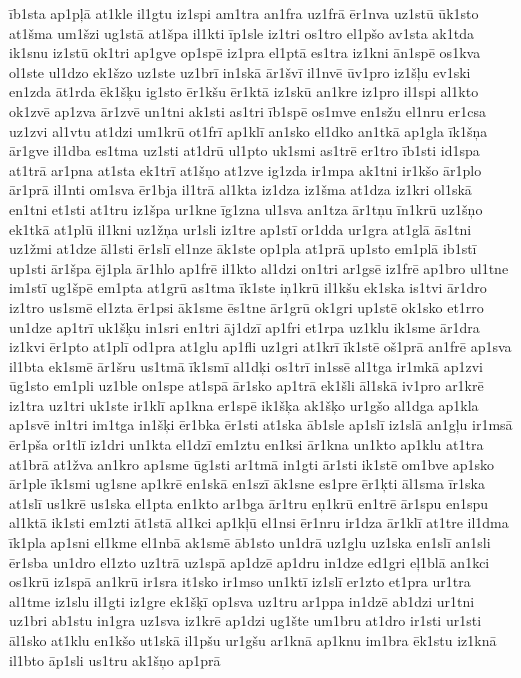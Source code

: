 {īb1sta
ap1pļā
at1kle
il1gtu
iz1spi
am1tra
an1fra
uz1frā
ēr1nva
uz1stū
ūk1sto
at1šma
um1šzi
ug1stā
at1špa
il1kti
īp1sle
iz1tri
os1tro
el1pšo
av1sta
ak1tda
ik1snu
iz1stū
ok1tri
ap1gve
op1spē
iz1pra
el1ptā
es1tra
iz1kni
ān1spē
os1kva
ol1ste
ul1dzo
ek1šzo
uz1ste
uz1brī
in1skā
ār1švī
il1nvē
ūv1pro
iz1šļu
ev1ski
en1zda
āt1rda
ēk1šķu
ig1sto
ēr1kšu
ēr1ktā
iz1skū
an1kre
iz1pro
il1spi
al1kto
ok1zvē
ap1zva
ār1zvē
un1tni
ak1sti
as1tri
īb1spē
os1mve
en1sžu
el1nru
er1csa
uz1zvi
al1vtu
at1dzi
um1krū
ot1frī
ap1klī
an1sko
el1dko
an1tkā
ap1gla
īk1šņa
ār1gve
il1dba
es1tma
uz1sti
at1drū
ul1pto
uk1smi
as1trē
er1tro
īb1sti
id1spa
at1trā
ar1pna
at1sta
ek1trī
at1šņo
at1zve
ig1zda
ir1mpa
ak1tni
ir1kšo
ār1plo
ār1prā
il1nti
om1sva
ēr1bja
il1trā
al1kta
iz1dza
iz1šma
at1dza
iz1kri
ol1skā
en1tni
et1sti
at1tru
iz1špa
ur1kne
īg1zna
ul1sva
an1tza
ār1tņu
īn1krū
uz1šņo
ek1tkā
at1plū
il1kni
uz1žņa
ur1sli
iz1tre
ap1stī
or1dda
ur1gra
at1glā
ās1tni
uz1žmi
at1dze
āl1sti
ēr1slī
el1nze
āk1ste
op1pla
at1prā
up1sto
em1plā
ib1stī
up1sti
ār1špa
ēj1pla
ār1hlo
ap1frē
il1kto
al1dzi
on1tri
ar1gsē
iz1frē
ap1bro
ul1tne
im1stī
ug1špē
em1pta
at1grū
as1tma
īk1ste
iņ1krū
il1kšu
ek1ska
is1tvi
ār1dro
iz1tro
us1smē
el1zta
ēr1psi
āk1sme
ēs1tne
ār1grū
ok1gri
up1stē
ok1sko
et1rro
un1dze
ap1trī
uk1šķu
in1sri
en1tri
āj1dzī
ap1fri
et1rpa
uz1klu
ik1sme
ār1dra
iz1kvi
ēr1pto
at1plī
od1pra
at1glu
ap1fli
uz1gri
at1krī
īk1stē
oš1prā
an1frē
ap1sva
il1bta
ek1smē
ār1šru
us1tmā
īk1smī
al1dķi
os1trī
in1ssē
al1tga
ir1mkā
ap1zvi
ūg1sto
em1pli
uz1ble
on1spe
at1spā
ār1sko
ap1trā
ek1šli
āl1skā
iv1pro
ar1krē
iz1tra
uz1tri
uk1ste
ir1klī
ap1kna
er1spē
ik1šķa
ak1šķo
ur1gšo
al1dga
ap1kla
ap1svē
in1tri
im1tga
in1šķi
ēr1bka
ēr1sti
at1ska
āb1sle
ap1slī
iz1slā
an1gļu
ir1msā
ēr1pša
or1tlī
iz1dri
un1kta
el1dzī
em1ztu
en1ksi
ār1kna
un1kto
ap1klu
at1tra
at1brā
at1žva
an1kro
ap1sme
ūg1sti
ar1tmā
in1gti
ār1sti
ik1stē
om1bve
ap1sko
ār1ple
īk1smi
ug1sne
ap1krē
en1skā
en1szī
āk1sne
es1pre
ēr1ķti
āl1sma
īr1ska
at1slī
us1krē
us1ska
el1pta
en1kto
ar1bga
ār1tru
eņ1krū
en1trē
ār1spu
en1spu
al1ktā
ik1sti
em1zti
āt1stā
al1kci
ap1kļū
el1nsi
ēr1nru
ir1dza
ār1klī
at1tre
il1dma
īk1pla
ap1sni
el1kme
el1nbā
ak1smē
āb1sto
un1drā
uz1glu
uz1ska
en1slī
an1sli
ēr1sba
un1dro
el1zto
uz1trā
uz1spā
ap1dzē
ap1dru
in1dze
ed1gri
eļ1blā
an1kci
os1krū
iz1spā
an1krū
ir1sra
it1sko
ir1mso
un1ktī
iz1slī
er1zto
et1pra
ur1tra
al1tme
iz1slu
il1gti
iz1gre
ek1šķī
op1sva
uz1tru
ar1ppa
in1dzē
ab1dzi
ur1tni
uz1bri
ab1stu
in1gra
uz1sva
iz1krē
ap1dzi
ug1šte
um1bru
at1dro
ir1sti
ur1sti
āl1sko
at1klu
en1kšo
ut1skā
il1pšu
ur1gšu
ar1knā
ap1knu
im1bra
ēk1stu
iz1knā
il1bto
āp1sli
us1tru
ak1šņo
ap1prā
}
